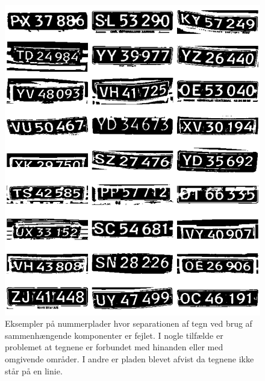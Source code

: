 \documentclass[11pt,a4paper,final]{article}
\begin{document}
\begin{figure}[htp]
\centering
\includegraphics[width=12cm]{appendix/illu/separation_errors.png} 
\caption{Eksempler på nummerplader hvor separationen af tegn ved brug af sammenhængende komponenter er fejlet. I nogle tilfælde er problemet at tegnene er forbundet med hinanden eller med omgivende områder. I andre er pladen blevet afvist da tegnene ikke står på en linie.}
\label{fig:illu:separation_errors}
\end{figure}
\end{document}
